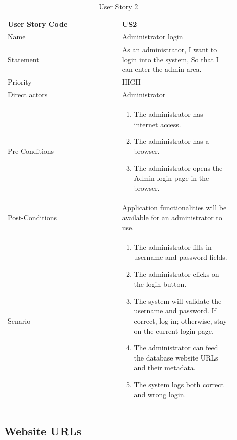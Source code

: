 \documentclass{scrartcl}
\begin{document}
\begin{table}[H]
  \caption{User Story 2}
  \begin{tabular}{p{0.45\linewidth} | p{0.45\linewidth}}
    \toprule
    User Story Code & US2 \\
    \midrule
    Name & Administrator login \\
    \hline
    Statement & As an administrator, I want to login into the system, So that I can enter the admin area. \\
    \hline
    Priority & HIGH \\
    \hline
    Direct actors & Administrator \\
    \hline
    Pre-Conditions & {
                     \begin{enumerate}
                     \item The administrator has internet access.
                     \item The administrator has a browser.
                     \item The administrator opens the Admin login page in the browser.
                     \end{enumerate}
                     } \\
    \hline
    Post-Conditions & Application functionalities will be available for an administrator to use. \\
    \hline
    Senario & {
              \begin{enumerate}
              \item The administrator fills in username and password fields.
              \item The administrator clicks on the login button.
              \item The system will validate the username and password. If correct, log in; otherwise, stay on the current login page.
              \item The administrator can feed the database website URLs and their metadata.
              \item The system logs both correct and wrong login.
              \end{enumerate}
              } \\
    \bottomrule
  \end{tabular}
\end{table}

\subsection{Website URLs}
\end{document}

